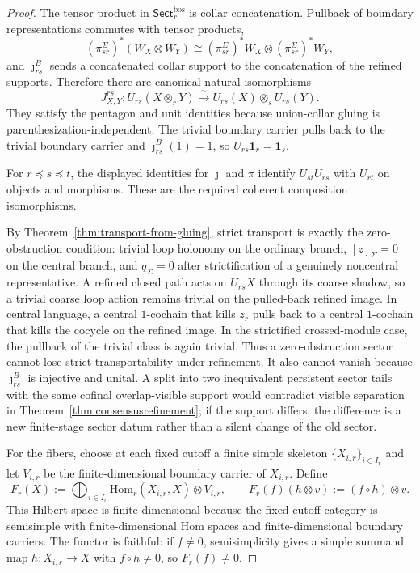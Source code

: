 \documentclass[11pt]{article}
\begin{document}
\begin{proof}
The tensor product in \(\mathsf{Sect}^{\mathrm{bos}}_r\) is collar concatenation. Pullback of
boundary representations commutes with tensor products,
\[
(\pi_{sr}^{\Sigma})^\ast(W_X\otimes W_Y)
\cong
(\pi_{sr}^{\Sigma})^\ast W_X\otimes(\pi_{sr}^{\Sigma})^\ast W_Y,
\]
and \(\jmath_{rs}^{B}\) sends a concatenated collar support to the concatenation of the refined
supports. Therefore there are canonical natural isomorphisms
\[
J^{rs}_{X,Y}:U_{rs}(X\otimes_r Y)\xrightarrow{\sim}U_{rs}(X)\otimes_s U_{rs}(Y).
\]
They satisfy the pentagon and unit identities because union-collar gluing is
parenthesization-independent. The trivial boundary carrier pulls back to the trivial boundary
carrier and \(\jmath_{rs}^{B}(1)=1\), so \(U_{rs}\mathbf 1_r=\mathbf 1_s\).

For \(r\preceq s\preceq t\), the displayed identities for \(\jmath\) and \(\pi\) identify
\(U_{st}U_{rs}\) with \(U_{rt}\) on objects and morphisms. These are the required coherent
composition isomorphisms.

By Theorem~\ref{thm:transport-from-gluing}, strict transport is exactly the zero-obstruction
condition: trivial loop holonomy on the ordinary branch, \([z]_\Sigma=0\) on the central branch,
and \(q_\Sigma=0\) after strictification of a genuinely noncentral representative. A refined
closed path acts on \(U_{rs}X\) through its coarse shadow, so a trivial coarse loop action remains
trivial on the pulled-back refined image. In central language, a central \(1\)-cochain that kills
\(z_r\) pulls back to a central \(1\)-cochain that kills the cocycle on the refined image. In the
strictified crossed-module case, the pullback of the trivial class is again trivial. Thus a
zero-obstruction sector cannot lose strict transportability under refinement. It also cannot vanish
because \(\jmath_{rs}^{B}\) is injective and unital. A split into two inequivalent persistent
sector tails with the same cofinal overlap-visible support would contradict visible separation in
Theorem~\ref{thm:consensusrefinement}; if the support differs, the difference is a new finite-stage
sector datum rather than a silent change of the old sector.

For the fibers, choose at each fixed cutoff a finite simple skeleton \(\{X_{i,r}\}_{i\in I_r}\) and
let \(V_{i,r}\) be the finite-dimensional boundary carrier of \(X_{i,r}\). Define
\[
F_r(X)
:=
\bigoplus_{i\in I_r}\mathrm{Hom}_r(X_{i,r},X)\otimes V_{i,r},
\qquad
F_r(f)(h\otimes v):=(f\circ h)\otimes v.
\]
This Hilbert space is finite-dimensional because the fixed-cutoff category is semisimple with
finite-dimensional Hom spaces and finite-dimensional boundary carriers. The functor is faithful:
if \(f\ne0\), semisimplicity gives a simple summand map \(h:X_{i,r}\to X\) with \(f\circ h\ne0\),
so \(F_r(f)\ne0\).


\end{proof}
\end{document}
